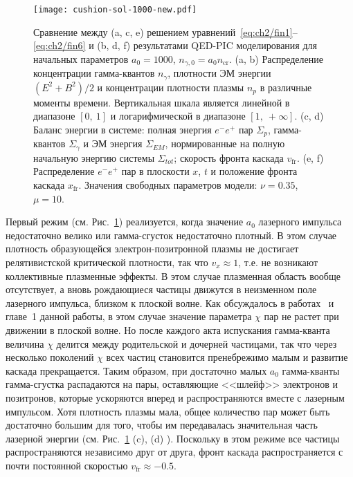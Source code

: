 \begin{figure}[h!]
    \texttt{[image: cushion-sol-1000-new.pdf]}
    \caption[Сравнение решения модельных уравнений, описывающий развитие КЭД каскада и результатов QED-PIC моделирования для начальных параметров $a_0=1000$, $n_{\gamma,0}=\a_0 n_\mathrm{cr}$]{\label{fig:ch2/sec3/sol1000} 
    Сравнение между (a, c, e) решением уравнений~\eqref{eq:ch2/fin1}--\eqref{eq:ch2/fin6} и (b, d, f) результатами QED-PIC моделирования для начальных параметров $a_0=1000$, $n_{\gamma,0}=a_0 n_\mathrm{cr}$.
    (a, b) Распределение концентрации гамма-квантов $n_\gamma$, плотности ЭМ энергии $(E^2+B^2)/2$ и концентрации плотности плазмы $n_p$ в различные моменты времени.
    Вертикальная шкала является линейной в диапазоне $[0,\ 1]$ и логарифмической в диапазоне $[1,\ +\!\infty]$.
    (c, d) Баланс энергии в системе: полная энергия $e^-e^+$ пар $\Sigma_p$, гамма-квантов $\Sigma_\gamma$ и ЭМ энергия $\Sigma_{EM}$, нормированные на полную начальную энергию системы $\Sigma_{tot}$; скорость фронта каскада $v_\mathrm{fr}$.
    (e, f) Распределение $e^-e^+$ пар в плоскости $x$, $t$ и положение фронта каскада $x_\mathrm{fr}$. Значения свободных параметров модели: $\nu=0.35$, $\mu=10$.}
\end{figure}

Первый режим (см. Рис.~\ref{fig:ch2/sec3/sol1000}) реализуется, когда значение $a_0$ лазерного импульса недостаточно велико или гамма-сгусток недостаточно плотный.
В этом случае плотность образующейся электрон-позитронной плазмы не достигает релятивистской критической плотности, так что $v_x\approx 1$, т.е. не возникают коллективные плазменные эффекты.
В этом случае плазменная область вообще отсутствует, а вновь рождающиеся частицы движутся в неизменном поле лазерного импульса, близком к плоской волне.
Как обсуждалось в работах~\cite{di2012extremely, bulanov2013electromagnetic, narozhny2015quantum, mironov2017observable} и главе~1 данной работы, в этом случае значение параметра $\chi$ пар не растет при движении в плоской волне.
Но после каждого акта испускания гамма-кванта величина $\chi$ делится между родительской и дочерней частицами, так что через несколько поколений $\chi$ всех частиц становится пренебрежимо малым и развитие каскада прекращается.
Таким образом, при достаточно малых $a_0$ гамма-кванты гамма-сгустка распадаются на пары, оставляющие <<шлейф>> электронов и позитронов, которые ускоряются вперед и распространяются вместе с лазерным импульсом.
Хотя плотность плазмы мала, общее количество пар может быть достаточно большим для того, чтобы им передавалась значительная часть лазерной энергии (см. Рис.~\ref{fig:ch2/sec3/sol1000} (c), (d) ).
Поскольку в этом режиме все частицы распространяются независимо друг от друга, фронт каскада распространяется с почти постоянной скоростью $v_\mathrm{fr}\approx -0.5$.

